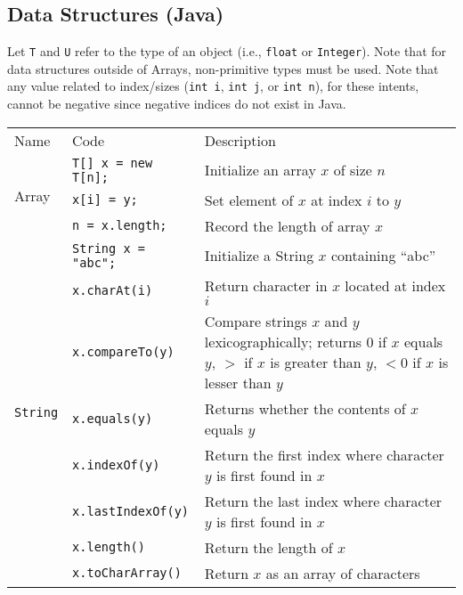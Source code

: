 \documentclass{article}
\begin{document}
\subsection{Data Structures (Java)}
Let \lstinline|T| and \lstinline|U| refer to the type of an object (i.e., \lstinline|float| or \lstinline|Integer|). Note that for data structures outside of Arrays, non-primitive types must be used.
Note that any value related to index/sizes (\lstinline|int i|, \lstinline|int j|, or \lstinline|int n|), for these intents, cannot be negative since negative indices do not exist in Java.
\setlength{\tabcolsep}{3pt}
\begin{center}\begin{tabularx}{\textwidth}{llX}\toprule
  Name & Code & Description\\
  \multirow{3}{*}{Array} & \lstinline|T[] x = new T[n];| & Initialize an array \(x\) of size \(n\)\\
                         & \lstinline|x[i] = y;| & Set element of \(x\) at index \(i\) to \(y\)\\
                         & \lstinline|n = x.length;| & Record the length of array \(x\) \\\midrule
  \multirow{12}{*}[-0.5em]{\lstinline|String|} & \lstinline|String x = "abc";| & Initialize a String \(x\) containing \enquote{abc}\\
                                         & \lstinline|x.charAt(i)| & Return character in \(x\) located at index \(i\)\\
                                         & \lstinline|x.compareTo(y)| & Compare strings \(x\) and \(y\) lexicographically; returns \(0\) if \(x\) equals \(y\), \(>\) if \(x\) is greater than \(y\), \(<0\) if \(x\) is lesser than \(y\)\\
                                         & \lstinline|x.equals(y)| & Returns whether the contents of \(x\) equals \(y\)\\
                                         & \lstinline|x.indexOf(y)| & Return the first index where character \(y\) is first found in \(x\)\\
                                         & \lstinline|x.lastIndexOf(y)| & Return the last index where character \(y\) is first found in \(x\)\\
                                         & \lstinline|x.length()| & Return the length of \(x\)\\
                                         & \lstinline|x.toCharArray()| & Return \(x\) as an array of characters\\

\end{tabularx}
\end{center}
\end{document}
